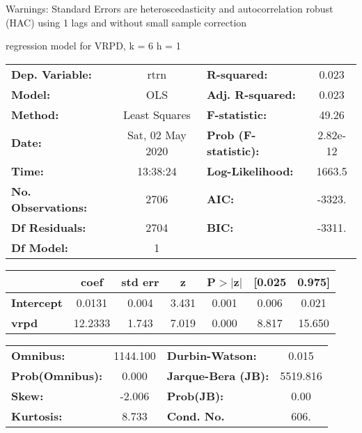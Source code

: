 Warnings: \newline
 [1] Standard Errors are heteroscedasticity and autocorrelation robust (HAC) using 1 lags and without small sample correction\ 

regression model for VRPD, k = 6 h = 1\begin{center}
\begin{tabular}{lclc}
\toprule
\textbf{Dep. Variable:}    &       rtrn       & \textbf{  R-squared:         } &     0.023   \\
\textbf{Model:}            &       OLS        & \textbf{  Adj. R-squared:    } &     0.023   \\
\textbf{Method:}           &  Least Squares   & \textbf{  F-statistic:       } &     49.26   \\
\textbf{Date:}             & Sat, 02 May 2020 & \textbf{  Prob (F-statistic):} &  2.82e-12   \\
\textbf{Time:}             &     13:38:24     & \textbf{  Log-Likelihood:    } &    1663.5   \\
\textbf{No. Observations:} &        2706      & \textbf{  AIC:               } &    -3323.   \\
\textbf{Df Residuals:}     &        2704      & \textbf{  BIC:               } &    -3311.   \\
\textbf{Df Model:}         &           1      & \textbf{                     } &             \\
\bottomrule
\end{tabular}
\begin{tabular}{lcccccc}
                   & \textbf{coef} & \textbf{std err} & \textbf{z} & \textbf{P$> |$z$|$} & \textbf{[0.025} & \textbf{0.975]}  \\
\midrule
\textbf{Intercept} &       0.0131  &        0.004     &     3.431  &         0.001        &        0.006    &        0.021     \\
\textbf{vrpd}      &      12.2333  &        1.743     &     7.019  &         0.000        &        8.817    &       15.650     \\
\bottomrule
\end{tabular}
\begin{tabular}{lclc}
\textbf{Omnibus:}       & 1144.100 & \textbf{  Durbin-Watson:     } &    0.015  \\
\textbf{Prob(Omnibus):} &   0.000  & \textbf{  Jarque-Bera (JB):  } & 5519.816  \\
\textbf{Skew:}          &  -2.006  & \textbf{  Prob(JB):          } &     0.00  \\
\textbf{Kurtosis:}      &   8.733  & \textbf{  Cond. No.          } &     606.  \\
\bottomrule
\end{tabular}
\end{center}

